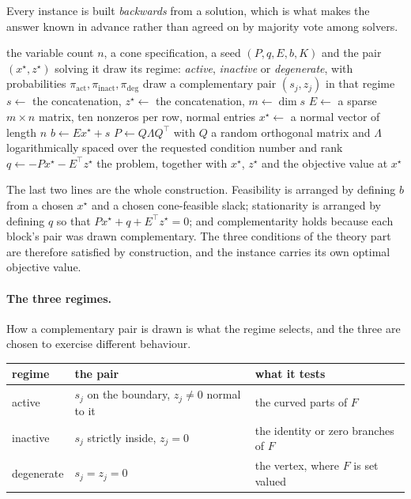 \documentclass[a4paper,11pt]{book}
\theoremstyle{plain}
\theoremstyle{definition}
\theoremstyle{remark}
\numberwithin{equation}{chapter}
\numberwithin{algorithm}{chapter}
\newcommand{\inner}[2]{\left\langle #1, #2 \right\rangle}
\begin{document}
	Every instance is built \emph{backwards} from a solution, which is what makes
	the answer known in advance rather than agreed on by majority vote among
	solvers.

	\begin{algorithm}[H]
		\caption{Generating one instance with a planted solution}
		\begin{algorithmic}[1]
			\Require the variable count $n$, a cone specification, a seed
			\Ensure $(P,q,E,b,K)$ and the pair $(x^{\star},z^{\star})$ solving it
			\State draw its regime: \emph{active}, \emph{inactive} or
			\emph{degenerate}, with probabilities
			$\pi_{\mathrm{act}},\pi_{\mathrm{inact}},\pi_{\mathrm{deg}}$
			\State draw a complementary pair $(s_j,z_j)$ in that regime
			\Comment{$s_j\in K_j$, $z_j\in K_j^*$, $\inner{s_j}{z_j}=0$}
			\EndFor
			\State $s\gets$ the concatenation, $z^{\star}\gets$ the concatenation,
			$m\gets\dim s$
			\State $E\gets$ a sparse $m\times n$ matrix, ten nonzeros per row,
			normal entries
			\State $x^{\star}\gets$ a normal vector of length $n$
			\State $b\gets Ex^{\star}+s$
			\State $P\gets Q\Lambda Q^{\top}$ with $Q$ a random orthogonal matrix
			and $\Lambda$ logarithmically spaced over the requested condition
			number and rank
			\State $q\gets-Px^{\star}-E^{\top}z^{\star}$
			\State \Return the problem, together with $x^{\star}$, $z^{\star}$ and
			the objective value at $x^{\star}$
		\end{algorithmic}
	\end{algorithm}

	The last two lines are the whole construction. Feasibility is arranged by
	defining $b$ from a chosen $x^{\star}$ and a chosen cone-feasible slack;
	stationarity is arranged by defining $q$ so that $Px^{\star}+q+E^{\top}
	z^{\star}=0$; and complementarity holds because each block's pair was drawn
	complementary. The three conditions of the theory part are therefore
	satisfied by construction, and the instance carries its own optimal objective
	value.

	\paragraph{The three regimes.}
	How a complementary pair is drawn is what the regime selects, and the three
	are chosen to exercise different behaviour.

	\begin{table}[H]
		\centering\small
		\begin{tabular}{lll}
			\toprule
			regime & the pair & what it tests\\
			\midrule
			active & $s_j$ on the boundary, $z_j\neq0$ normal to it
			& the curved parts of $F$\\
			inactive & $s_j$ strictly inside, $z_j=0$
			& the identity or zero branches of $F$\\
			degenerate & $s_j=z_j=0$
			& the vertex, where $F$ is set valued\\
			\bottomrule
		\end{tabular}
	\end{table}
\end{document}
